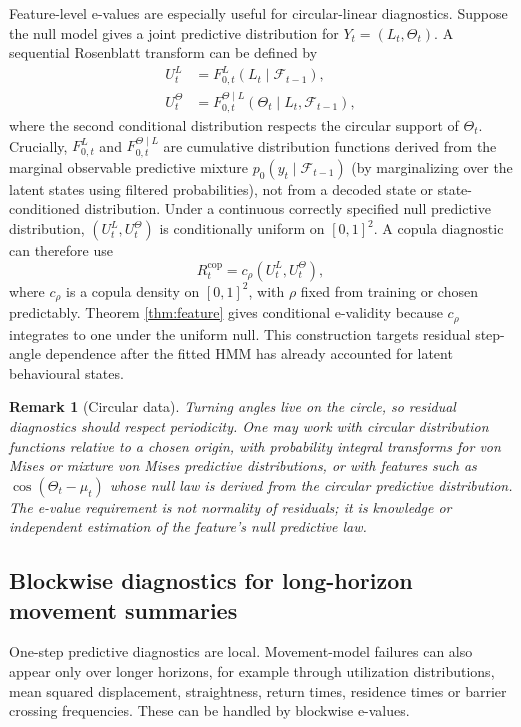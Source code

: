 \documentclass[pdflatex,sn-basic]{sn-jnl}
\theoremstyle{thmstyleone}
\theoremstyle{thmstyletwo}
\newtheorem{remark}{Remark}
\theoremstyle{thmstylethree}
\newcommand{\1}{\mathbf 1}
\newcommand{\calF}{\mathcal F}
\begin{document}
Feature-level e-values are especially useful for circular-linear diagnostics. Suppose the null model gives a joint predictive distribution for $Y_t=(L_t,\Theta_t)$. A sequential Rosenblatt transform can be defined by
\begin{align}
 U_t^L &= F_{0,t}^L(L_t\mid\calF_{t-1}),\\
 U_t^\Theta &= F_{0,t}^{\Theta\mid L}(\Theta_t\mid L_t,\calF_{t-1}),
\end{align}
where the second conditional distribution respects the circular support of $\Theta_t$. Crucially, $F_{0,t}^L$ and $F_{0,t}^{\Theta\mid L}$ are cumulative distribution functions derived from the marginal observable predictive mixture $p_0(y_t\mid\calF_{t-1})$ (by marginalizing over the latent states using filtered probabilities), not from a decoded state or state-conditioned distribution. Under a continuous correctly specified null predictive distribution, $(U_t^L,U_t^\Theta)$ is conditionally uniform on $[0,1]^2$. A copula diagnostic can therefore use
\begin{equation}
 R_t^{\mathrm{cop}}=c_\rho(U_t^L,U_t^\Theta),
\end{equation}
where $c_\rho$ is a copula density on $[0,1]^2$, with $\rho$ fixed from training or chosen predictably. Theorem \ref{thm:feature} gives conditional e-validity because $c_\rho$ integrates to one under the uniform null. This construction targets residual step-angle dependence after the fitted HMM has already accounted for latent behavioural states.

\begin{remark}[Circular data]
Turning angles live on the circle, so residual diagnostics should respect periodicity. One may work with circular distribution functions relative to a chosen origin, with probability integral transforms for von Mises or mixture von Mises predictive distributions, or with features such as $\cos(\Theta_t-\mu_t)$ whose null law is derived from the circular predictive distribution. The e-value requirement is not normality of residuals; it is knowledge or independent estimation of the feature's null predictive law.
\end{remark}

\subsection{Blockwise diagnostics for long-horizon movement summaries}

One-step predictive diagnostics are local. Movement-model failures can also appear only over longer horizons, for example through utilization distributions, mean squared displacement, straightness, return times, residence times or barrier crossing frequencies. These can be handled by blockwise e-values.
\end{document}
